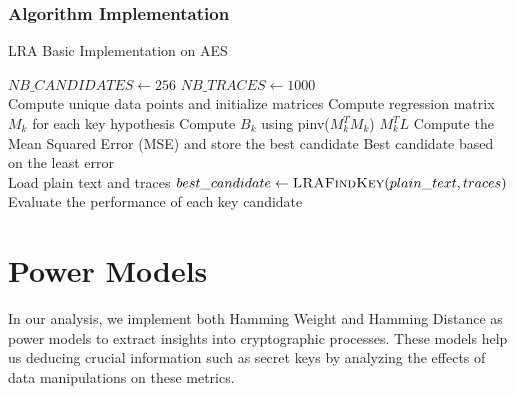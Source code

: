 \documentclass[a4paper,10pt]{article}
\begin{document}
\subsubsection{Algorithm Implementation}
\begin{algorithm}
    \caption{LRA Basic Implementation on AES}
    \label{algo2}
    \begin{algorithmic}
    \State $NB\_CANDIDATES \gets 256$
    \State $NB\_TRACES \gets 1000$ \\
        \State Compute unique data points and initialize matrices
            \State Compute regression matrix $M_k$ for each key hypothesis
            \State Compute $B_k$ using pinv($M_k^T M_k$) $M_k^T L$
            \State Compute the Mean Squared Error (MSE) and store the best candidate
        \EndFor
        \State \Return Best candidate based on the least error
    \EndFunction \\
    \State Load plain text and traces
    \State $best\_candidate \gets \Call{LRAFindKey}{plain\_text, traces}$
    \State Evaluate the performance of each key candidate
    \end{algorithmic}
\end{algorithm}

\section{Power Models}
In our analysis, we implement both Hamming Weight and Hamming Distance as power models to extract insights into cryptographic processes. 
These models help us deducing crucial information such as secret keys by analyzing the effects of data manipulations on these metrics.
\end{document}
